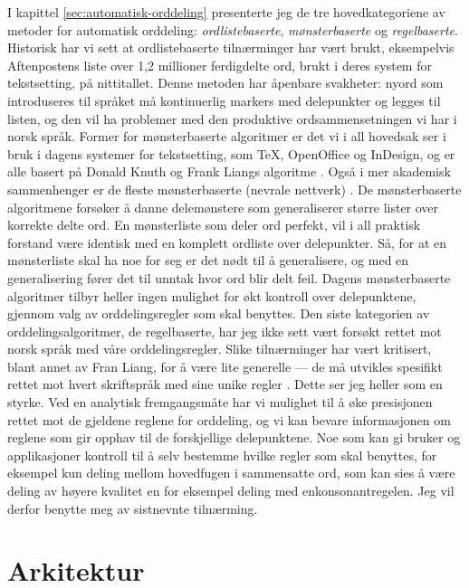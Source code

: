 I kapittel \ref{sec:automatisk-orddeling} presenterte jeg de tre hovedkategoriene av metoder for automatisk orddeling: \textit{ordlistebaserte}, \textit{mønsterbaserte} og \textit{regelbaserte}. Historisk har vi sett at ordlistebaserte tilnærminger har vært brukt, eksempelvis Aftenpostens liste over 1,2 millioner ferdigdelte ord, brukt i deres system for tekstsetting, på nittitallet. Denne metoden har åpenbare svakheter: nyord som introduseres til språket må kontinuerlig markers med delepunkter og legges til listen, og den vil ha problemer med den produktive ordsammensetningen vi har i norsk språk. Former for mønsterbaserte algoritmer er det vi i all hovedsak ser i bruk i dagens systemer for tekstsetting, som \TeX{}, OpenOffice og InDesign, og er alle basert på Donald Knuth og Frank Liangs algoritme \cite{smrvz1996word, knuth1986texbook, wiki-tex}. Også i mer akademisk sammenhenger er de fleste mønsterbaserte (nevrale nettverk) \cite{nemeth2006automatic, kristensen1998two}. De mønsterbaserte algoritmene forsøker å danne delemønstere som generaliserer større lister over korrekte delte ord. En mønsterliste som deler ord perfekt, vil i all praktisk forstand være identisk med en komplett ordliste over delepunkter. Så, for at en mønsterliste skal ha noe for seg er det nødt til å generalisere, og med en generalisering fører det til unntak hvor ord blir delt feil. Dagens mønsterbaserte algoritmer tilbyr heller ingen mulighet for økt kontroll over delepunktene, gjennom valg av orddelingsregler som skal benyttes. Den siste kategorien av orddelingsalgoritmer, de regelbaserte, har jeg ikke sett vært forsøkt rettet mot norsk språk med våre orddelingsregler. Slike tilnærminger har vært kritisert, blant annet av Fran Liang, for å være lite generelle — de må utvikles spesifikt rettet mot hvert skriftspråk med sine unike regler \cite{liang1983word}. Dette ser jeg heller som en styrke. Ved en analytisk fremgangsmåte har vi mulighet til å øke presisjonen rettet mot de gjeldene reglene for orddeling, og vi kan bevare informasjonen om reglene som gir opphav til de forskjellige delepunktene. Noe som kan gi bruker og applikasjoner kontroll til å selv bestemme hvilke regler som skal benyttes, for eksempel kun deling mellom hovedfugen i sammensatte ord, som kan sies å være deling av høyere kvalitet en for eksempel deling med enkonsonantregelen. Jeg vil derfor benytte meg av sistnevnte tilnærming.

\section{Arkitektur}

